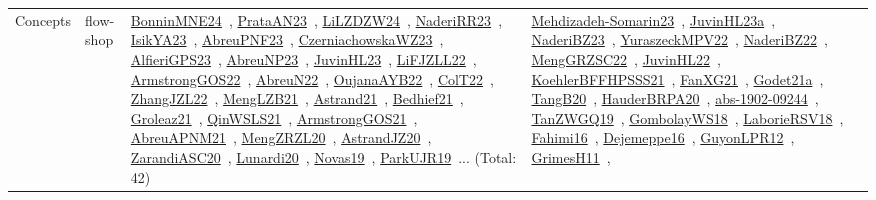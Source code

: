 {\begin{longtable}{lp{3cm}>{\raggedright\arraybackslash}p{6cm}>{\raggedright\arraybackslash}p{6cm}>{\raggedright\arraybackslash}p{8cm}}
\index{flow-shop}\index{Concepts!flow-shop}Concepts & flow-shop & \href{../works/BonninMNE24.pdf}{BonninMNE24}~\cite{BonninMNE24}, \href{../works/PrataAN23.pdf}{PrataAN23}~\cite{PrataAN23}, \href{../works/LiLZDZW24.pdf}{LiLZDZW24}~\cite{LiLZDZW24}, \href{../works/NaderiRR23.pdf}{NaderiRR23}~\cite{NaderiRR23}, \href{../works/IsikYA23.pdf}{IsikYA23}~\cite{IsikYA23}, \href{../works/AbreuPNF23.pdf}{AbreuPNF23}~\cite{AbreuPNF23}, \href{../works/CzerniachowskaWZ23.pdf}{CzerniachowskaWZ23}~\cite{CzerniachowskaWZ23}, \href{../works/AlfieriGPS23.pdf}{AlfieriGPS23}~\cite{AlfieriGPS23}, \href{../works/AbreuNP23.pdf}{AbreuNP23}~\cite{AbreuNP23}, \href{../works/JuvinHL23.pdf}{JuvinHL23}~\cite{JuvinHL23}, \href{../works/LiFJZLL22.pdf}{LiFJZLL22}~\cite{LiFJZLL22}, \href{../works/ArmstrongGOS22.pdf}{ArmstrongGOS22}~\cite{ArmstrongGOS22}, \href{../works/AbreuN22.pdf}{AbreuN22}~\cite{AbreuN22}, \href{../works/OujanaAYB22.pdf}{OujanaAYB22}~\cite{OujanaAYB22}, \href{../works/ColT22.pdf}{ColT22}~\cite{ColT22}, \href{../works/ZhangJZL22.pdf}{ZhangJZL22}~\cite{ZhangJZL22}, \href{../works/MengLZB21.pdf}{MengLZB21}~\cite{MengLZB21}, \href{../works/Astrand21.pdf}{Astrand21}~\cite{Astrand21}, \href{../works/Bedhief21.pdf}{Bedhief21}~\cite{Bedhief21}, \href{../works/Groleaz21.pdf}{Groleaz21}~\cite{Groleaz21}, \href{../works/QinWSLS21.pdf}{QinWSLS21}~\cite{QinWSLS21}, \href{../works/ArmstrongGOS21.pdf}{ArmstrongGOS21}~\cite{ArmstrongGOS21}, \href{../works/AbreuAPNM21.pdf}{AbreuAPNM21}~\cite{AbreuAPNM21}, \href{../works/MengZRZL20.pdf}{MengZRZL20}~\cite{MengZRZL20}, \href{../works/AstrandJZ20.pdf}{AstrandJZ20}~\cite{AstrandJZ20}, \href{../works/ZarandiASC20.pdf}{ZarandiASC20}~\cite{ZarandiASC20}, \href{../works/Lunardi20.pdf}{Lunardi20}~\cite{Lunardi20}, \href{../works/Novas19.pdf}{Novas19}~\cite{Novas19}, \href{../works/ParkUJR19.pdf}{ParkUJR19}~\cite{ParkUJR19}... (Total: 42) & \href{../works/Mehdizadeh-Somarin23.pdf}{Mehdizadeh-Somarin23}~\cite{Mehdizadeh-Somarin23}, \href{../works/JuvinHL23a.pdf}{JuvinHL23a}~\cite{JuvinHL23a}, \href{../works/NaderiBZ23.pdf}{NaderiBZ23}~\cite{NaderiBZ23}, \href{../works/YuraszeckMPV22.pdf}{YuraszeckMPV22}~\cite{YuraszeckMPV22}, \href{../works/NaderiBZ22.pdf}{NaderiBZ22}~\cite{NaderiBZ22}, \href{../works/MengGRZSC22.pdf}{MengGRZSC22}~\cite{MengGRZSC22}, \href{../works/JuvinHL22.pdf}{JuvinHL22}~\cite{JuvinHL22}, \href{../works/KoehlerBFFHPSSS21.pdf}{KoehlerBFFHPSSS21}~\cite{KoehlerBFFHPSSS21}, \href{../works/FanXG21.pdf}{FanXG21}~\cite{FanXG21}, \href{../works/Godet21a.pdf}{Godet21a}~\cite{Godet21a}, \href{../works/TangB20.pdf}{TangB20}~\cite{TangB20}, \href{../works/HauderBRPA20.pdf}{HauderBRPA20}~\cite{HauderBRPA20}, \href{../works/abs-1902-09244.pdf}{abs-1902-09244}~\cite{abs-1902-09244}, \href{../works/TanZWGQ19.pdf}{TanZWGQ19}~\cite{TanZWGQ19}, \href{../works/GombolayWS18.pdf}{GombolayWS18}~\cite{GombolayWS18}, \href{../works/LaborieRSV18.pdf}{LaborieRSV18}~\cite{LaborieRSV18}, \href{../works/Fahimi16.pdf}{Fahimi16}~\cite{Fahimi16}, \href{../works/Dejemeppe16.pdf}{Dejemeppe16}~\cite{Dejemeppe16}, \href{../works/GuyonLPR12.pdf}{GuyonLPR12}~\cite{GuyonLPR12}, \href{../works/GrimesH11.pdf}{GrimesH11}~\cite{GrimesH11}, 
\end{longtable}}
